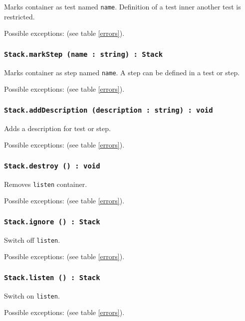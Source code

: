 Marks container as test named \texttt{name}. Definition of a test inner another test is restricted.

Possible exceptions:  (see table \ref{errors}).

\subsubsection{\texttt{Stack.markStep (name : string) : Stack}}

Marks container as step named \texttt{name}. A step can be defined in a test or step.

Possible exceptions:  (see table \ref{errors}).

\subsubsection{\texttt{Stack.addDescription (description : string) : void}}

Adds a description for test or step.

Possible exceptions:  (see table \ref{errors}).

\subsubsection{\texttt{Stack.destroy () : void}}

Removes \texttt{listen} container.

Possible exceptions:  (see table \ref{errors}).

\subsubsection{\texttt{Stack.ignore () : Stack}}

Switch off \texttt{listen}.

Possible exceptions:  (see table \ref{errors}).

\subsubsection{\texttt{Stack.listen () : Stack}}

Switch on \texttt{listen}.

Possible exceptions:  (see table \ref{errors}).

